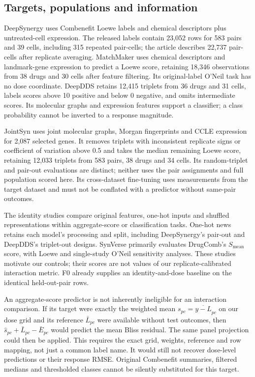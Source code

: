 \documentclass[11pt]{article}
\begin{document}
\subsection{Targets, populations and information}
DeepSynergy \citep{preuer2018} uses Combenefit Loewe labels and chemical descriptors plus untreated-cell expression. The released labels contain 23,052 rows for 583 pairs and 39 cells, including 315 repeated pair-cells; the article describes 22,737 pair-cells after replicate averaging. MatchMaker \citep{kuru2022matchmaker} uses chemical descriptors and landmark-gene expression to predict a Loewe score, retaining 18,346 observations from 38 drugs and 30 cells after feature filtering. Its original-label O'Neil task has no dose coordinate. DeepDDS \citep{wang2022deepdds} retains 12,415 triplets from 36 drugs and 31 cells, labels scores above 10 positive and below 0 negative, and omits intermediate scores. Its molecular graphs and expression features support a classifier; a class probability cannot be inverted to a response magnitude.

JointSyn \citep{li2024jointsyn} uses joint molecular graphs, Morgan fingerprints and CCLE expression for 2,087 selected genes. It removes triplets with inconsistent replicate signs or coefficient of variation above 0.5 and takes the median remaining Loewe score, retaining 12,033 triplets from 583 pairs, 38 drugs and 34 cells. Its random-triplet and pair-out evaluations are distinct; neither uses the pair assignments and full population scored here. Its cross-dataset fine-tuning uses measurements from the target dataset and must not be conflated with a predictor without same-pair outcomes.

The identity studies \citep{candir2026,tasnina2025} compare original features, one-hot inputs and shuffled representations within aggregate-score or classification tasks. One-hot news retains each model's processing and split, including DeepSynergy's pair-out and DeepDDS's triplet-out designs. SynVerse primarily evaluates DrugComb's $S_{\mathrm{mean}}$ score, with Loewe and single-study O'Neil sensitivity analyses. These studies motivate our controls; their scores are not values of our replicate-calibrated interaction metric. F0 already supplies an identity-and-dose baseline on the identical held-out-pair rows.

An aggregate-score predictor is not inherently ineligible for an interaction comparison. If its target were exactly the weighted mean $s_{pc}=\overline{y-L}_{pc}$ on our dose grid and its reference $\bar L_{pc}$ were available without test outcomes, then $\hat s_{pc}+\bar L_{pc}-\bar E_{pc}$ would predict the mean Bliss residual. The same panel projection could then be applied. This requires the exact grid, weights, reference and row mapping, not just a common label name. It would still not recover dose-level predictions or their response RMSE. Original Combenefit summaries, filtered medians and thresholded classes cannot be silently substituted for this target.
\end{document}
